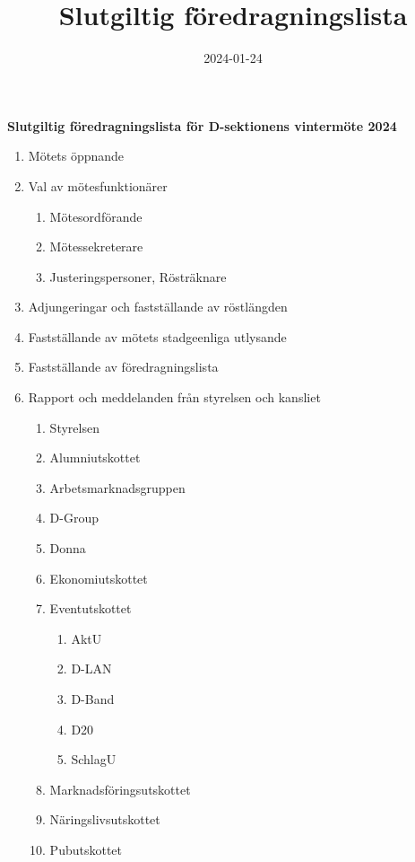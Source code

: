 \documentclass{datateknologsektionen-document}
\title{Slutgiltig föredragningslista}
\date{2024-01-24}
\begin{document}
\large
\begin{center}
  {\LARGE\bfseries Slutgiltig föredragningslista för D-sektionens vintermöte 2024}
  \vspace{2mm}
\end{center}

\Large
\begin{enumerate}[topsep=0pt,itemsep=1ex]
  \item Mötets öppnande
  \item Val av mötesfunktionärer
        \begin{enumerate}[label*=\arabic*.,leftmargin=3em]
          \item Mötesordförande
          \item Mötessekreterare
          \item Justeringspersoner, Rösträknare
        \end{enumerate}
  \item Adjungeringar och fastställande av röstlängden
  \item Fastställande av mötets stadgeenliga utlysande
  \item Fastställande av föredragningslista
  \item Rapport och meddelanden från styrelsen och kansliet
        \begin{enumerate}[label*=\arabic*.,leftmargin=3em]
          \item Styrelsen
          \item Alumniutskottet
          \item Arbetsmarknadsgruppen
          \item D-Group
          \item Donna
          \item Ekonomiutskottet
          \item Eventutskottet
            \begin{enumerate}[label*=\arabic*.,leftmargin=2em]
                \item AktU
                \item D-LAN
                \item D-Band
                \item D20
                \item SchlagU
            \end{enumerate}
          \item Marknadsföringsutskottet
          \item Näringslivsutskottet
          \item Pubutskottet

\end{enumerate}
\end{enumerate}
\end{document}
